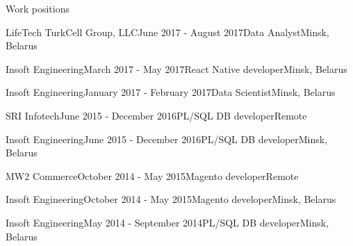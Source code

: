 \documentclass{resume} %
\begin{document}
\begin{rSection}{Work positions}

\begin{rSubsection}{LifeTech TurkCell Group, LLC}{June 2017 - August 2017}{Data Analyst}{Minsk, Belarus}
\item
\end{rSubsection}

\begin{rSubsection}{Insoft Engineering}{March 2017 - May 2017}{React Native developer}{Minsk, Belarus}
\item
\end{rSubsection}

\begin{rSubsection}{Insoft Engineering}{January 2017 - February 2017}{Data Scientist}{Minsk, Belarus}
\item
\end{rSubsection}

\begin{rSubsection}{SRI Infotech}{June 2015 - December 2016}{PL/SQL DB developer}{Remote}
\item
\end{rSubsection}

\begin{rSubsection}{Insoft Engineering}{June 2015 - December 2016}{PL/SQL DB developer}{Minsk, Belarus}
\item
\end{rSubsection}

\begin{rSubsection}{MW2 Commerce}{October 2014 - May 2015}{Magento developer}{Remote}
\item
\end{rSubsection}

\begin{rSubsection}{Insoft Engineering}{October 2014 - May 2015}{Magento developer}{Minsk, Belarus}
\item
\end{rSubsection}

\begin{rSubsection}{Insoft Engineering}{May 2014 - September 2014}{PL/SQL DB developer}{Minsk, Belarus}
\item
\end{rSubsection}

\end{rSection}

\end{document}
